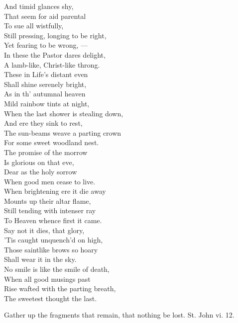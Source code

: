  And timid glances shy, \\
 That seem for aid parental \\
 To sue all wistfully, \\
 Still pressing, longing to be right, \\
 Yet fearing to be wrong, — \\
 In these the Pastor dares delight, \\
 A lamb-like, Christ-like throng. \\
  These in Life’s distant even \\
 Shall shine serenely bright, \\
 As in th’ autumnal heaven \\
 Mild rainbow tints at night, \\
 When the last shower is stealing down, \\
 And ere they sink to rest, \\
 The sun-beams weave a parting crown \\
 For some sweet woodland nest. \\
  The promise of the morrow \\
 Is glorious on that eve, \\
 Dear as the holy sorrow \\
 When good men cease to live. \\
 When brightening ere it die away \\
 Mounts up their altar flame, \\
 Still tending with intenser ray \\
 To Heaven whence first it came. \\
  Say not it dies, that glory, \\
 ’Tis caught unquench’d on high, \\
 Those saintlike brows so hoary \\
 Shall wear it in the sky. \\
 No smile is like the smile of death, \\
 When all good musings past \\
 Rise wafted with the parting breath, \\
 The sweetest thought the last.\\


Gather up the fragments that remain, that nothing be lost. St. John vi. 12.

